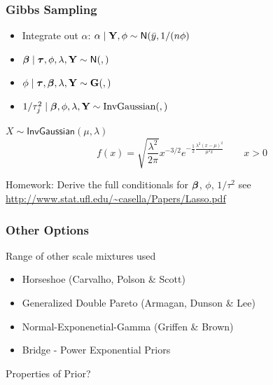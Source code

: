 \documentclass[handout]{beamer}
\begin{document}
\begin{frame}
  \frametitle{Gibbs Sampling}
  \begin{itemize}
  \item Integrate out $\alpha$: $\alpha \mid \mathbf{Y}, \phi \sim \textsf{N}(\bar{y},
    1/(n \phi)$  \pause
\item $\boldsymbol{\beta} \mid \boldsymbol{\tau}, \phi, \lambda, \mathbf{Y} \sim \textsf{N}(, )$   \pause
\item $\phi \mid \boldsymbol{\tau}, \boldsymbol{\beta}, \lambda, \mathbf{Y} \sim \mathbf{G}( , ) $  \pause
\item $1/\tau_j^2 \mid \boldsymbol{\beta}, \phi, \lambda, \mathbf{Y} \sim \text{InvGaussian}(
  , )$  \pause
  \end{itemize}
$X \sim \textsf{InvGaussian}(\mu,  \lambda)$
$$
f(x) =  \sqrt{\frac{\lambda^2}{2 \pi}}  x^{-3/2} e^{- \frac{1}{2} \frac{
    \lambda^2( x - \mu)^2} {\mu^2 x}} \qquad x > 0
$$  \pause

Homework:  Derive the full conditionals for $\boldsymbol{\beta}$, $\phi$,
$1/\tau^2$  see \url{http://www.stat.ufl.edu/~casella/Papers/Lasso.pdf} 
\end{frame}
\begin{frame}
  \frametitle{Other Options}
  Range of other scale mixtures used  \pause
  \begin{itemize}
  \item Horseshoe  (Carvalho, Polson \& Scott)  \pause
  \item Generalized Double Pareto (Armagan, Dunson \& Lee)  \pause
  \item Normal-Exponenetial-Gamma (Griffen \& Brown)  \pause
  \item Bridge - Power Exponential Priors  \pause
   \end{itemize}
Properties of Prior?   \pause
\end{frame}
\end{document}
